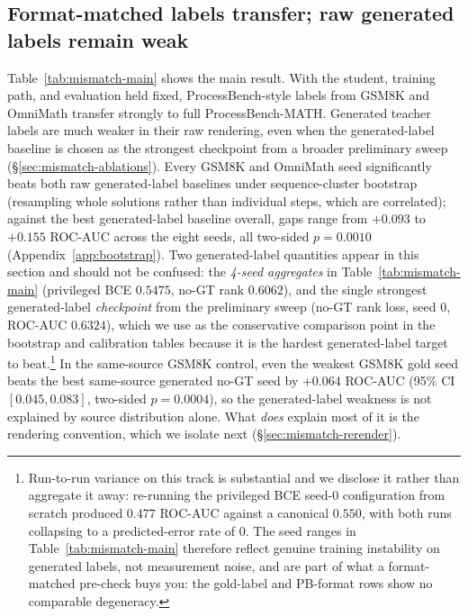 \documentclass{article}
\begin{document}
\subsection{Format-matched labels transfer; raw generated labels remain weak}
\label{sec:mismatch-main}
Table~\ref{tab:mismatch-main} shows the main result. With the student,
training path, and evaluation held fixed, ProcessBench-style labels from
GSM8K and OmniMath transfer strongly to full ProcessBench-MATH. Generated
teacher labels are much weaker in their raw rendering, even when the generated-label baseline is
chosen as the strongest checkpoint from a broader preliminary sweep
(\S\ref{sec:mismatch-ablations}). Every GSM8K and OmniMath seed
significantly beats both raw generated-label baselines under sequence-cluster
bootstrap (resampling whole solutions rather than individual steps, which
are correlated); against the best generated-label baseline overall, gaps
range from $+0.093$ to $+0.155$ ROC-AUC across the eight seeds, all
two-sided $p = 0.0010$ (Appendix~\ref{app:bootstrap}). Two generated-label
quantities appear in this section and should not be confused: the
\emph{4-seed aggregates} in Table~\ref{tab:mismatch-main} (privileged BCE
$0.5475$, no-GT rank $0.6062$), and the single strongest generated-label
\emph{checkpoint} from the preliminary sweep (no-GT rank loss, seed 0, ROC-AUC
$0.6324$), which we use as the conservative comparison point in the bootstrap
and calibration tables because it is the hardest generated-label target to
beat.\footnote{Run-to-run variance on this track is substantial and we disclose
it rather than aggregate it away: re-running the privileged BCE seed-0
configuration from scratch produced $0.477$ ROC-AUC against a canonical
$0.550$, with both runs collapsing to a predicted-error rate of $0$. The
seed ranges in Table~\ref{tab:mismatch-main} therefore reflect genuine
training instability on generated labels, not measurement noise, and are part
of what a format-matched pre-check buys you: the gold-label and PB-format rows
show no comparable degeneracy.}
In the same-source GSM8K control, even the weakest GSM8K gold seed beats the
best same-source generated no-GT seed by $+0.064$ ROC-AUC (95\% CI
$[0.045,0.083]$, two-sided $p=0.0004$), so the generated-label weakness is
not explained by source distribution alone. What \emph{does} explain most of
it is the rendering convention, which we isolate next
(\S\ref{sec:mismatch-rerender}).
\end{document}
